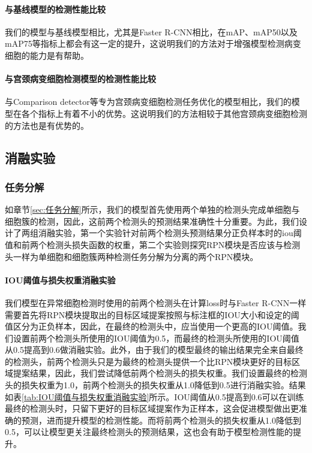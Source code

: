 \paragraph{与基线模型的检测性能比较}
\par 我们的模型与基线模型相比，尤其是Faster R-CNN相比，在mAP、mAP50以及mAP75等指标上都会有这一定的提升，这说明我们的方法对于增强模型检测病变细胞的能力是有帮助。
\paragraph{与宫颈病变细胞检测模型的检测性能比较}
\par 与Comparison detector等专为宫颈病变细胞检测任务优化的模型相比，我们的模型在各个指标上有着不小的优势。这说明我们的方法相较于其他宫颈病变细胞检测的方法也是有优势的。

\subsection{消融实验}
\subsubsection{任务分解}
\par 如章节\ref{sec:任务分解}所示，我们的模型首先使用两个单独的检测头完成单细胞与细胞簇的检测，因此，这前两个检测头的预测结果准确性十分重要。为此，我们设计了两组消融实验，第一个实验针对前两个检测头预测结果分正负样本时的iou阈值和前两个检测头损失函数的权重，第二个实验则探究RPN模块是否应该与检测头一样为单细胞和细胞簇两种检测任务分解为分离的两个RPN模块。

\paragraph{IOU阈值与损失权重消融实验}
\par 我们模型在异常细胞检测时使用的前两个检测头在计算loss时与Faster R-CNN一样需要首先将RPN模块提取出的目标区域提案按照与标注框的IOU大小和设定的阈值区分为正负样本，因此，在最终的检测头中，应当使用一个更高的IOU阈值。我们设置前两个检测头所使用的IOU阈值为0.5，而最终的检测头所使用的IOU阈值从0.5提高到0.6做消融实验。此外，由于我们的模型最终的输出结果完全来自最终的检测头，前两个检测头只是为最终的检测头提供一个比RPN模块更好的目标区域提案结果，因此，我们尝试降低前两个检测头的损失权重。我们设置最终的检测头的损失权重为1.0，前两个检测头的损失权重从1.0降低到0.5进行消融实验。结果如表\ref{tab:IOU阈值与损失权重消融实验}所示。IOU阈值从0.5提高到0.6可以在训练最终的检测头时，只留下更好的目标区域提案作为正样本，这会促进模型做出更准确的预测，进而提升模型的检测性能。而将前两个检测头的损失权重从1.0降低到0.5，可以让模型更关注最终检测头的预测结果，这也会有助于模型检测性能的提升。

